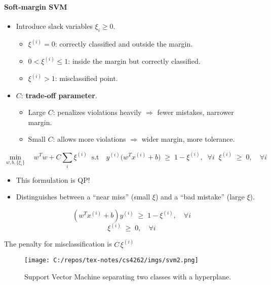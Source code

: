 \documentclass[11pt]{article}
\begin{document}
\paragraph*{Soft-margin SVM}

\begin{itemize}
    \item Introduce slack variables $\xi_i \geq 0$.
        \begin{itemize}
            \item $\xi^{(i)} = 0$: correctly classified and outside the margin.
            \item $0 < \xi^{(i)} \leq 1$: inside the margin but correctly classified.
            \item $\xi^{(i)} > 1$: misclassified point.
        \end{itemize}
    \item $C$: \textbf{trade-off parameter}.
        \begin{itemize}
            \item Large $C$: penalizes violations heavily $\Rightarrow$ fewer mistakes, narrower margin.
            \item Small $C$: allows more violations $\Rightarrow$ wider margin, more tolerance.
        \end{itemize}
\end{itemize}


\[
 \min_{w,b,\{\xi_i\}} \quad w^T w + C \sum_i \xi^{(i)} \; \; \text{s.t} \quad y^{(i)} \big(w^T x^{(i)} + b\big) \;\geq\; 1 - \xi^{(i)}, \; \; \forall i \;\; \xi^{(i)} \;\geq\; 0, \quad \forall i
\]

\begin{itemize}
    \item This formulation is QP!
    \item Distinguishes between a ``near miss'' (small $\xi$) and a ``bad mistake'' (large $\xi$).
\end{itemize}

\[
(w^T x^{(i)} + b) y^{(i)} \;\geq\; 1 - \xi^{(i)}, \quad \forall i
\]
\[
\xi^{(i)} \;\geq\; 0, \quad \forall i
\]

The penalty for misclassification is $C \, \xi^{(i)}$

\begin{figure}[h!]
\centering
\texttt{[image: C:/repos/tex-notes/cs4262/imgs/svm2.png]}
\caption{Support Vector Machine separating two classes with a hyperplane.}
\end{figure}
\end{document}
